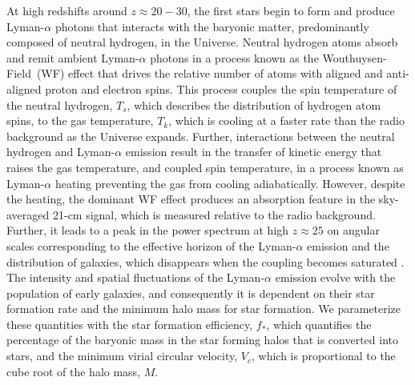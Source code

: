At high redshifts around $z\approx 20 - 30$, the first stars begin to form and produce Lyman-$\alpha$ photons that interacts with the baryonic matter, predominantly composed of neutral hydrogen, in the Universe. Neutral hydrogen atoms absorb and remit ambient Lyman-$\alpha$ photons in a process known as the Wouthuysen-Field~(WF) effect \cite{Wouthuysen1952, Field1959} that drives the relative number of atoms with aligned and anti-aligned proton and electron spins. This process couples the spin temperature of the neutral hydrogen, $T_s$, which describes the distribution of hydrogen atom spins, to the gas temperature, $T_k$, which is cooling at a faster rate than the radio background as the Universe expands. Further, interactions between the neutral hydrogen and Lyman-$\alpha$ emission result in the transfer of kinetic energy that raises the gas temperature, and coupled spin temperature, in a process known as Lyman-$\alpha$ heating \cite{Madau1997, Chuzhoy2007} preventing the gas from cooling adiabatically. However, despite the heating, the dominant WF effect produces an absorption feature in the sky-averaged 21-cm signal, which is measured relative to the radio background. Further, it leads to a peak in the power spectrum at high $z \approx 25$ on angular scales corresponding to the effective horizon of the Lyman-$\alpha$ emission and the distribution of galaxies, which disappears when the coupling becomes saturated \cite{Cohen_power_2018}. The intensity and spatial fluctuations of the Lyman-$\alpha$ emission evolve with the population of early galaxies, and consequently it is dependent on their star formation rate and the minimum halo mass for star formation. We parameterize these quantities with the star formation efficiency, $f_*$, which quantifies the percentage of the baryonic mass in the star forming halos that is converted into stars, and the minimum virial circular velocity, $V_c$,  which is proportional to the cube root of the halo mass, $M$.


